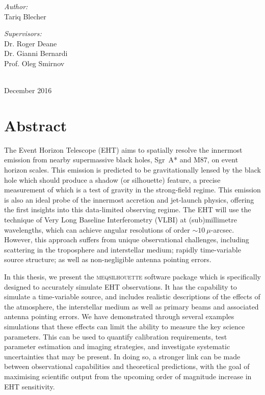 \begin{titlepage}
\begin{minipage}{0.45\textwidth}
\begin{flushleft}\large 
\emph{Author:} \\
Tariq  {\sc Blecher}\\
\end{flushleft}
\end{minipage}
\begin{minipage}{0.45\textwidth}

\begin{flushright} \large
\emph{Supervisors:} \\
Dr. Roger {\sc Deane} \\
Dr. Gianni {\sc Bernardi} \\
Prof. Oleg {\sc Smirnov} \\
\end{flushright}
\end{minipage}\\[2cm]


{\large December 2016}

\end{titlepage}

\chapter*{Abstract} 
The Event Horizon Telescope (EHT) aims to spatially resolve the innermost emission from nearby supermassive black holes, Sgr~A* and M87, on event horizon scales. This emission is predicted to be gravitationally lensed by the black hole which should produce a shadow (or silhouette) feature, a precise measurement of which is a test of gravity in the strong-field regime. This emission is also an ideal probe of the innermost accretion and jet-launch physics, offering the first insights into this data-limited observing regime. The EHT will use the technique of Very Long Baseline Interferometry (VLBI) at (sub)millimetre wavelengths, which can achieve angular resolutions of order $\sim10~\mu$-arcsec. However, this approach suffers from unique observational challenges, including scattering in the troposphere and interstellar medium; rapidly time-variable source structure; as well as non-negligible antenna pointing errors. 


In this thesis, we present the \textsc{meqsilhouette} software package which is specifically designed to accurately simulate EHT observations. It has the capability to simulate a time-variable source, and includes realistic descriptions of the effects of the atmosphere, the interstellar medium as well as primary beams and associated antenna pointing errors. We have demonstrated through several examples simulations that these effects can limit the ability to measure the key science parameters. This can be used to quantify calibration requirements, test parameter estimation and imaging strategies, and investigate systematic uncertainties that may be present. In doing so, a stronger link can be made between observational capabilities and theoretical predictions, with the goal of maximising scientific output from the upcoming order of magnitude increase in EHT sensitivity. 

